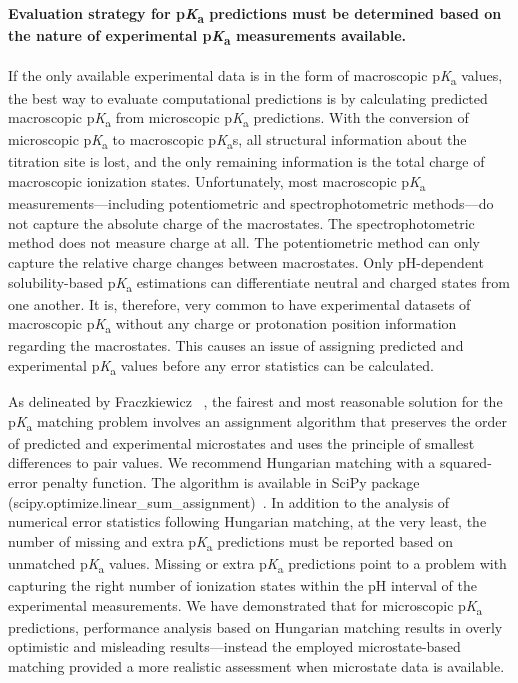 \documentclass[9pt,lineno,final]{elife}
\newcommand{\pKa}{p\textit{K}\textsubscript{a}}
\begin{document}
\paragraph{Evaluation strategy for \pKa{} predictions must be determined based on the nature of experimental \pKa{} measurements available.}
If the only available experimental data is in the form of macroscopic \pKa{} values, the best way to evaluate computational predictions is by calculating predicted macroscopic \pKa{} from microscopic \pKa{} predictions. 
With the conversion of microscopic \pKa{} to macroscopic \pKa{}s, all structural information about the titration site is lost, and the only remaining information is the total charge of macroscopic ionization states.
Unfortunately, most macroscopic \pKa{} measurements---including potentiometric and spectrophotometric methods---do not capture the absolute charge of the macrostates. 
The spectrophotometric method does not measure charge at all. 
The potentiometric method can only capture the relative charge changes between macrostates.  
Only pH-dependent solubility-based \pKa{} estimations can differentiate neutral and charged states from one another. 
It is, therefore, very common to have experimental datasets of macroscopic \pKa{} without any charge or protonation position information regarding the macrostates.
This causes an issue of assigning predicted and experimental \pKa{} values before any error statistics can be calculated.

As delineated by Fraczkiewicz ~\citep{Fraczkiewicz:2013:ReferenceModuleinChemistryMolecularSciencesandChemicalEngineering}, the fairest and most reasonable solution for the \pKa{} matching problem involves an assignment algorithm that preserves the order of predicted and experimental microstates and uses the principle of smallest differences to pair values. 
We recommend Hungarian matching with a squared-error penalty function. 
The algorithm is available in SciPy package (scipy.optimize.linear\_sum\_assignment)~\citep{SciPy-linear-sum-assignment}.
In addition to the analysis of numerical error statistics following Hungarian matching, at the very least, the number of missing and extra \pKa{} predictions must be reported based on unmatched \pKa{} values. 
Missing or extra \pKa{} predictions point to a problem with capturing the right number of ionization states within the pH interval of the experimental measurements. 
We have demonstrated that for microscopic \pKa{} predictions, performance analysis based on Hungarian matching results in overly optimistic and misleading results---instead the employed microstate-based matching provided a more realistic assessment when microstate data is available. 
\end{document}
